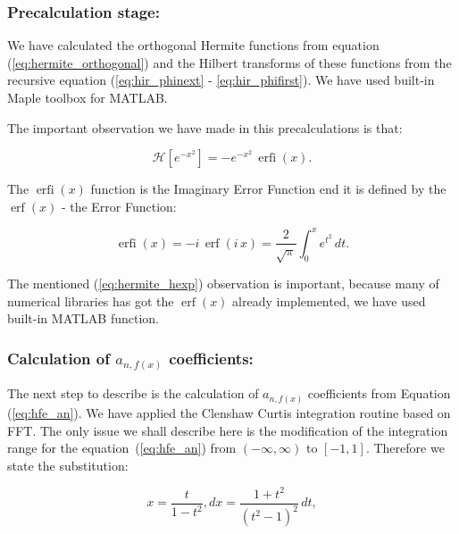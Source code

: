 \documentclass[12pt,twoside,a4paper]{article}
\numberwithin{equation}{subsection}
\numberwithin{figure}{subsection}
\begin{document}
\subsubsection*{Precalculation stage:}


We have calculated the orthogonal Hermite functions from equation (\ref{eq:hermite_orthogonal}) and the Hilbert transforms of these functions from the recursive equation (\ref{eq:hir_phinext} - \ref{eq:hir_phifirst}). We have used built-in Maple toolbox for MATLAB.

The important observation we have made in this precalculations is that:

\begin{equation} \label{eq:hermite_hexp}
	\mathcal{H}[e^{-x^2}] = - e^{-x^2} \, \mathop{\mathrm{erfi}}(x) .  
\end{equation}

The $\mathop{\mathrm{erfi}}(x)$ function is the Imaginary Error Function end it is defined by the $\mathop{\mathrm{erf}}(x)$ - the Error
Function:

\begin{equation} \label{eq:hermite_erfi}
	\mathop{\mathrm{erfi}}(x) = - i \, \mathop{\mathrm{erf}} (i \, x) = \frac{2}{\sqrt{\pi}} \int_0^x e^{t^2} \, dt .    
\end{equation}

The mentioned (\ref{eq:hermite_hexp}) observation is important, because many of numerical libraries has got the $\mathop{\mathrm{erf}}(x)$ already implemented, we have used built-in MATLAB function.

\subsubsection*{Calculation of $a_{n, f(x)}$ coefficients:}

The next step to describe is the calculation of $a_{n, f(x)}$ coefficients from Equation (\ref{eq:hfe_an}). We have applied the Clenshaw Curtis integration routine based on FFT. The only issue we shall describe here is the modification of the integration range for the equation~(\ref{eq:hfe_an}) from $(-\infty , \infty)$ to $[-1, 1]$. Therefore we state the substitution:

\begin{subequations} \label{eq:her_substitution}
	\begin{equation} \label{eq:her_subst_x}
		x = \frac{t} {1 - t ^ 2},
	\end{equation}
	\begin{equation} \label{eq:her_subst_dx}
		dx = \frac{1 + t ^ 2} {(t ^ 2 - 1) ^ 2} \, dt,
	\end{equation} 
\end{subequations}
\end{document}
